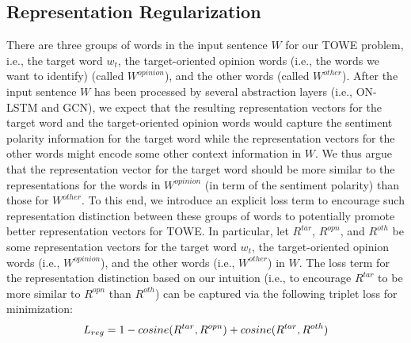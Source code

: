 \documentclass[11pt,a4paper]{article}
\begin{document}
\subsection{Representation Regularization}
\label{sec:reg}
There are three groups of words in the input sentence $W$ for our TOWE problem, i.e., the target word $w_t$, the target-oriented opinion words (i.e., the words we want to identify) (called $W^{opinion}$), and the other words (called $W^{other}$). After the input sentence $W$ has been processed by several abstraction layers (i.e., ON-LSTM and GCN), we expect that the resulting representation vectors for the target word and the target-oriented opinion words would capture the sentiment polarity information for the target word while the representation vectors for the other words might encode some other context information in $W$. We thus argue that the representation vector for the target word should be more similar to the representations for the words in $W^{opinion}$ (in term of the sentiment polarity) than those for $W^{other}$. To this end, we introduce an explicit loss term to encourage such representation distinction between these groups of words to potentially promote better representation vectors for TOWE. In particular, let $R^{tar}$, $R^{opn}$, and $R^{oth}$ be some representation vectors for the target word $w_t$, the target-oriented opinion words (i.e., $W^{opinion}$), and the other words (i.e., $W^{other}$) in $W$. The loss term for the representation distinction based on our intuition (i.e., to encourage $R^{tar}$ to be more similar to $R^{opn}$ than $R^{oth}$) can be captured via the following triplet loss for minimization:
\begin{equation}
\label{eq:reg-loss}
\small
    L_{reg} = 1 - cosine(R^{tar}, R^{opn}) + cosine(R^{tar}, R^{oth})
\end{equation}
\end{document}
